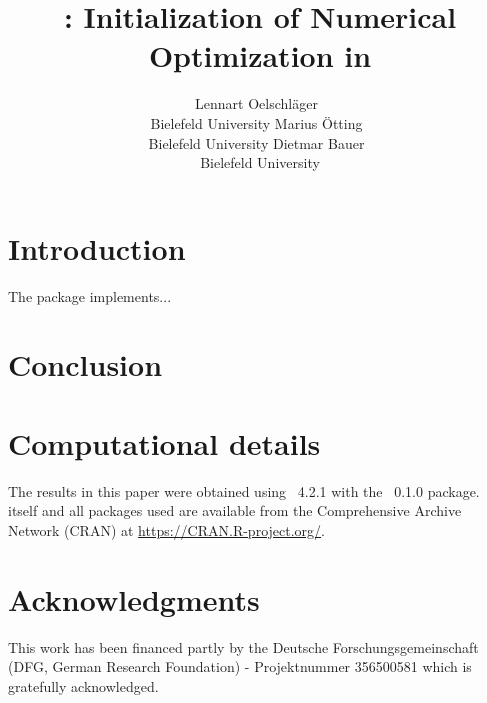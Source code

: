 \documentclass[article,shortnames]{jss}
\author{Lennart Oelschl\"ager~\orcidlink{0000-0001-5421-9313}\\Bielefeld University \And Marius \"Otting~\orcidlink{0000-0002-9373-0365}\\Bielefeld University \And Dietmar Bauer~\orcidlink{0000-0003-2920-7032}\\Bielefeld University}
\title{\pkg{ino}: Initialization of Numerical Optimization in \proglang{R}}
\newcommand{\fct}[1]{\code{#1()}}
\begin{document}


\section{Introduction}
\label{sec:introduction}

The  \citep{R} package  \citep{Oelschlaeger:2022} implements...

\section{Conclusion} \label{sec:conclusion}

\section*{Computational details}

The results in this paper were obtained using
~4.2.1 with the
~0.1.0 package.  itself
and all packages used are available from the Comprehensive
 Archive Network (CRAN) at \url{https://CRAN.R-project.org/}.

\section*{Acknowledgments}

This work has been financed partly by the Deutsche Forschungsgemeinschaft (DFG, German Research Foundation) - Projektnummer 356500581 which is gratefully acknowledged.


\end{document}
